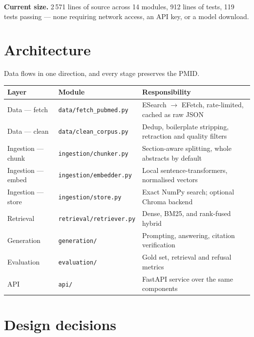\documentclass[a4paper,11pt]{article}
\newcommand{\code}[1]{\texttt{\small #1}}
\begin{document}
\noindent
\textbf{Current size.} 2\,571 lines of source across 14 modules, 912 lines of
tests, 119 tests passing --- none requiring network access, an API key, or a
model download.

\section{Architecture}

Data flows in one direction, and every stage preserves the PMID.

\begin{center}
\small
\begin{tabular}{@{}llp{7.6cm}@{}}
\toprule
\textbf{Layer} & \textbf{Module} & \textbf{Responsibility} \\
\midrule
Data --- fetch     & \code{data/fetch\_pubmed.py}   & ESearch $\rightarrow$ EFetch, rate-limited, cached as raw JSON \\
Data --- clean     & \code{data/clean\_corpus.py}   & Dedup, boilerplate stripping, retraction and quality filters \\
Ingestion --- chunk & \code{ingestion/chunker.py}   & Section-aware splitting, whole abstracts by default \\
Ingestion --- embed & \code{ingestion/embedder.py}  & Local sentence-transformers, normalised vectors \\
Ingestion --- store & \code{ingestion/store.py}     & Exact NumPy search; optional Chroma backend \\
Retrieval          & \code{retrieval/retriever.py}  & Dense, BM25, and rank-fused hybrid \\
Generation         & \code{generation/}             & Prompting, answering, citation verification \\
Evaluation         & \code{evaluation/}             & Gold set, retrieval and refusal metrics \\
API                & \code{api/}                    & FastAPI service over the same components \\
\bottomrule
\end{tabular}
\end{center}

\section{Design decisions}
\end{document}
